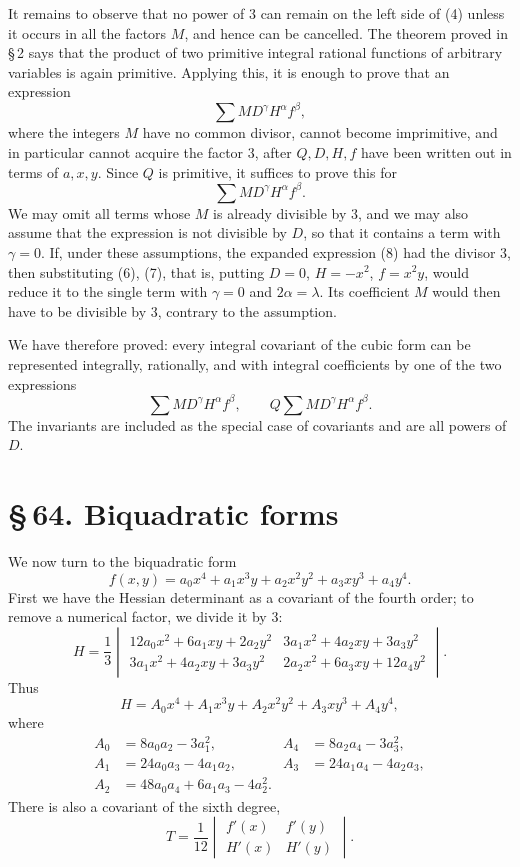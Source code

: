 \documentclass[11pt]{article}
\providecommand{\sect}[2]{\section*{\S\,#1. #2}}
\begin{document}
It remains to observe that no power of $3$ can remain on the left side of (4) unless it occurs in all the factors $M$, and hence can be cancelled. The theorem proved in \S\,2 says that the product of two primitive integral rational functions of arbitrary variables is again primitive. Applying this, it is enough to prove that an expression
\[
 \sum M D^\gamma H^\alpha f^\beta,
\]
where the integers $M$ have no common divisor, cannot become imprimitive, and in particular cannot acquire the factor $3$, after $Q,D,H,f$ have been written out in terms of $a,x,y$. Since $Q$ is primitive, it suffices to prove this for
\begin{equation}
 \sum M D^\gamma H^\alpha f^\beta.
\tag{8}
\end{equation}
We may omit all terms whose $M$ is already divisible by $3$, and we may also assume that the expression is not divisible by $D$, so that it contains a term with $\gamma=0$. If, under these assumptions, the expanded expression (8) had the divisor $3$, then substituting (6), (7), that is, putting $D=0$, $H=-x^2$, $f=x^2y$, would reduce it to the single term with $\gamma=0$ and $2\alpha=\lambda$. Its coefficient $M$ would then have to be divisible by $3$, contrary to the assumption.

We have therefore proved: every integral covariant of the cubic form can be represented integrally, rationally, and with integral coefficients by one of the two expressions
\[
 \sum M D^\gamma H^\alpha f^\beta,
 \qquad
 Q\sum M D^\gamma H^\alpha f^\beta.
\]
The invariants are included as the special case of covariants and are all powers of $D$.

\sect{64}{Biquadratic forms}

We now turn to the biquadratic form
\begin{equation}
 f(x,y)=a_0x^4+a_1x^3y+a_2x^2y^2+a_3xy^3+a_4y^4.
\tag{1}
\end{equation}
First we have the Hessian determinant as a covariant of the fourth order; to remove a numerical factor, we divide it by $3$:
\begin{equation}
 H=\frac13\begin{vmatrix}
 12a_0x^2+6a_1xy+2a_2y^2 & 3a_1x^2+4a_2xy+3a_3y^2\\
 3a_1x^2+4a_2xy+3a_3y^2 & 2a_2x^2+6a_3xy+12a_4y^2
 \end{vmatrix}.
\tag{2}
\end{equation}
Thus
\[
 H=A_0x^4+A_1x^3y+A_2x^2y^2+A_3xy^3+A_4y^4,
\]
where
\[
\begin{aligned}
 A_0&=8a_0a_2-3a_1^2, & A_4&=8a_2a_4-3a_3^2,\\
 A_1&=24a_0a_3-4a_1a_2, & A_3&=24a_1a_4-4a_2a_3,\\
 A_2&=48a_0a_4+6a_1a_3-4a_2^2.
\end{aligned}
\]
There is also a covariant of the sixth degree,
\begin{equation}
 T=\frac1{12}\begin{vmatrix} f'(x)&f'(y)\\ H'(x)&H'(y)\end{vmatrix}.
\tag{3}
\end{equation}
\end{document}
